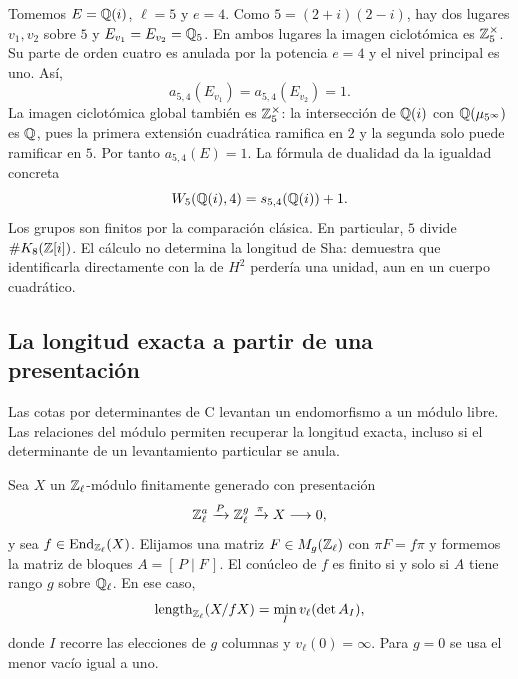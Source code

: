 Tomemos $E=\mathbb{Q}(i)$, $\ell=5$ y $e=4$. Como
$5=(2+i)(2-i)$, hay dos lugares $v_1,v_2$ sobre $5$ y
$E_{v_1}=E_{v_2}=\mathbb{Q}_5$. En ambos lugares la imagen ciclotómica
es $\mathbb{Z}_5^\times$. Su parte de orden cuatro es anulada por la
potencia $e=4$ y el nivel principal es uno. Así,
\[
 a_{5,4}(E_{v_1})=a_{5,4}(E_{v_2})=1.
\]
La imagen ciclotómica global también es $\mathbb{Z}_5^\times$:
la intersección de $\mathbb{Q}(i)$ con $\mathbb{Q}(\mu_{5^\infty})$ es $\mathbb{Q}$,
pues la primera extensión cuadrática ramifica en $2$ y la segunda
solo puede ramificar en $5$. Por tanto $a_{5,4}(E)=1$.
La fórmula de dualidad da la igualdad concreta
\begin{equation}
 W_5(\mathbb{Q}(i),4)=s_{5,4}(\mathbb{Q}(i))+1.
 \label{eq:fu-ejemplo-gauss}
\end{equation}
Los grupos son finitos por la comparación clásica. En particular,
$5$ divide $\#K_8(\mathbb{Z}[i])$. El cálculo no determina la longitud
de Sha: demuestra que identificarla directamente con la de $H^2$
perdería una unidad, aun en un cuerpo cuadrático.

\subsection{La longitud exacta a partir de una presentación}

Las cotas por determinantes de C levantan un endomorfismo a un
módulo libre. Las relaciones del módulo permiten recuperar la
longitud exacta, incluso si el determinante de un levantamiento
particular se anula.

\begin{proposicion}
\label{prop:fu-menores}
Sea $X$ un $\mathbb{Z}_\ell$-módulo finitamente generado con presentación
\[
 \mathbb{Z}_\ell^a\xrightarrow{P}\mathbb{Z}_\ell^g\xrightarrow{\pi}X
 \longrightarrow0,
\]
y sea $f\in\operatorname{End}_{\mathbb{Z}_\ell}(X)$.
Elijamos una matriz $F\in M_g(\mathbb{Z}_\ell)$ con $\pi F=f\pi$
y formemos la matriz de bloques $A=[\,P\mid F\,]$.
El conúcleo de $f$ es finito si y solo si $A$ tiene rango $g$
sobre $\mathbb{Q}_\ell$. En ese caso,
\begin{equation}
 \operatorname{length}_{\mathbb{Z}_\ell}(X/fX)
 =\min_I v_\ell(\det A_I),
 \label{eq:fu-menores}
\end{equation}
donde $I$ recorre las elecciones de $g$ columnas y
$v_\ell(0)=\infty$. Para $g=0$ se usa el menor vacío igual a uno.
\end{proposicion}

